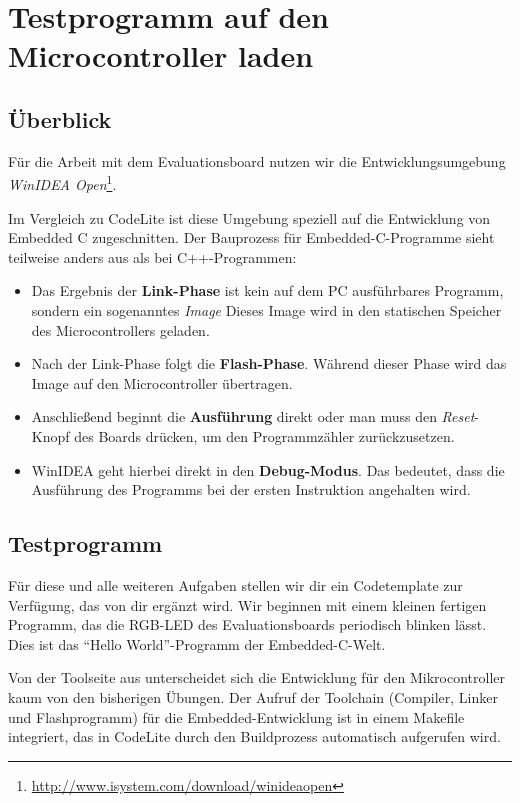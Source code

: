 \section{\ExercisePrefixEmbeddedC Testprogramm auf den Microcontroller laden \optional}

\subsection{Überblick}
Für die Arbeit mit dem Evaluationsboard nutzen wir die Entwicklungsumgebung \emph{WinIDEA Open}\footnote{\url{http://www.isystem.com/download/winideaopen}}.

Im Vergleich zu CodeLite ist diese Umgebung speziell auf die Entwicklung von Embedded C zugeschnitten.
Der Bauprozess für Embedded-C-Programme sieht teilweise anders aus als bei C++-Programmen:
\begin{itemize}
\item 
Das Ergebnis der \textbf{Link-Phase} ist kein auf dem PC ausführbares Programm, sondern ein sogenanntes \emph{Image}
Dieses Image wird in den statischen Speicher des Microcontrollers geladen.
\item
Nach der Link-Phase folgt die \textbf{Flash-Phase}.
Während dieser Phase wird das Image auf den Microcontroller übertragen.
\item 
Anschließend beginnt die \textbf{Ausführung} direkt oder man muss den \emph{Reset}-Knopf des Boards drücken, um den Programmzähler zurückzusetzen.
\item
WinIDEA geht hierbei direkt in den \textbf{Debug-Modus}.
Das bedeutet, dass die Ausführung des Programms bei der ersten Instruktion angehalten wird.
\end{itemize}

\subsection{Testprogramm}
Für diese und alle weiteren Aufgaben stellen wir dir ein Codetemplate zur Verfügung, das von dir ergänzt wird.
Wir beginnen mit einem kleinen fertigen Programm, das die RGB-LED des Evaluationsboards periodisch blinken lässt.
Dies ist das \enquote{Hello World}-Programm der Embedded-C-Welt.


Von der Toolseite aus unterscheidet sich die Entwicklung für den Mikrocontroller kaum von den bisherigen Übungen.
Der Aufruf der Toolchain (Compiler, Linker und Flashprogramm) für die Embedded-Entwicklung ist in einem Makefile integriert, das in CodeLite durch den Buildprozess automatisch aufgerufen wird.